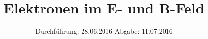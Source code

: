 

\subject{V501-2 Korrektur}
\title{Elektronen im E- und B-Feld}
\date{
  Durchführung: 28.06.2016
  \hspace{3em}
  Abgabe: 11.07.2016
}



\maketitle
\thispagestyle{empty}
\tableofcontents
\newpage








\printbibliography


